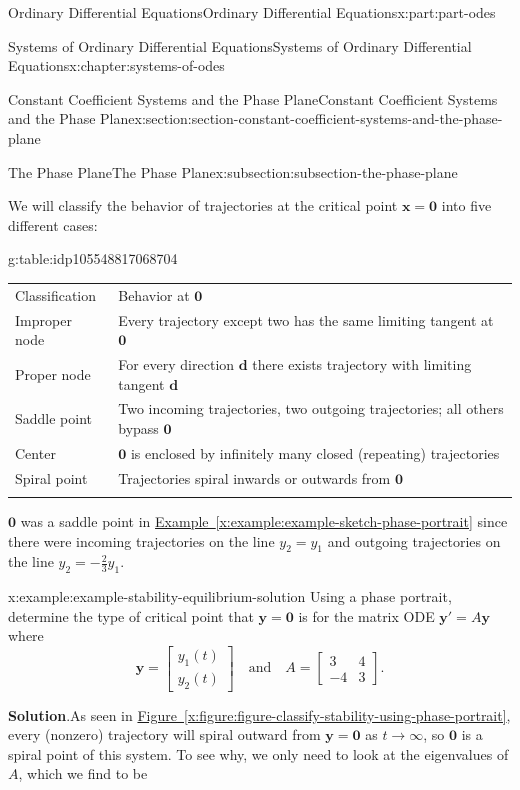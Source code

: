 \documentclass[twoside,10pt,]{book}
\newcommand{\blocktitlefont}{\relax}
\newcommand{\tabularfont}{\relax}
\newcommand{\xreffont}{\relax}
\numberwithin{equation}{part}
\newcommand{\hrulethick} {\noalign{\hrule height 0.11em}}
\renewcommand{\vec}[1]{\mathbf{#1}}
\newcommand{\amp}{&}
\begin{document}
\begin{partptx}{Ordinary Differential Equations}{}{Ordinary Differential Equations}{}{}{x:part:part-odes}
\begin{chapterptx}{Systems of Ordinary Differential Equations}{}{Systems of Ordinary Differential Equations}{}{}{x:chapter:systems-of-odes}
\begin{sectionptx}{Constant Coefficient Systems and the Phase Plane}{}{Constant Coefficient Systems and the Phase Plane}{}{}{x:section:section-constant-coefficient-systems-and-the-phase-plane}
\begin{subsectionptx}{The Phase Plane}{}{The Phase Plane}{}{}{x:subsection:subsection-the-phase-plane}
\par
We will classify the behavior of trajectories at the critical point \(\vec{x} = \vec{0}\) into five different cases:%
\begin{tableptx}{\textbf{}}{g:table:idp105548817068704}{}%
\centering%
{\tabularfont%
\begin{tabular}{ll}\hrulethick
Classification&Behavior at \(\vec{0}\)\tabularnewline\hrulethick
Improper node&Every trajectory except two has the same limiting tangent at \(\vec{0}\)\tabularnewline[0pt]
Proper node&For every direction \(\vec{d}\) there exists trajectory with limiting tangent \(\vec{d}\)\tabularnewline[0pt]
Saddle point&Two incoming trajectories, two outgoing trajectories; all others bypass \(\vec{0}\)\tabularnewline[0pt]
Center&\(\vec{0}\) is enclosed by infinitely many closed (repeating) trajectories\tabularnewline[0pt]
Spiral point&Trajectories spiral inwards or outwards from \(\vec{0}\)\tabularnewline\hrulethick
\end{tabular}
}%
\end{tableptx}%
\(\vec{0}\) was a saddle point in \hyperref[x:example:example-sketch-phase-portrait]{Example~{\xreffont\ref{x:example:example-sketch-phase-portrait}}} since there were incoming trajectories on the line \(y_{2} = y_{1}\) and outgoing trajectories on the line \(y_{2} = -\frac{2}{3}y_{1}\).%
\begin{example}{}{x:example:example-stability-equilibrium-solution}%
Using a phase portrait, determine the type of critical point that \(\vec{y} = \vec{0}\) is for the matrix ODE \(\vec{y}'=A\vec{y}\) where%
\begin{equation*}
\vec{y} = \begin{bmatrix}y_{1}(t) \\ y_{2}(t)\end{bmatrix}\quad\text{and}\quad A = \begin{bmatrix}3 \amp  4 \\ -4 \amp  3\end{bmatrix}.
\end{equation*}
%
\par\smallskip%
\noindent\textbf{\blocktitlefont Solution}.\hypertarget{g:solution:idp105548817242656}{}\quad{}As seen in \hyperref[x:figure:figure-classify-stability-using-phase-portrait]{Figure~{\xreffont\ref{x:figure:figure-classify-stability-using-phase-portrait}}}, every (nonzero) trajectory will spiral outward from \(\vec{y} = \vec{0}\) as \(t\to\infty\), so \(\vec{0}\) is a spiral point of this system. To see why, we only need to look at the eigenvalues of \(A\), which we find to be%

\end{example}
\end{subsectionptx}
\end{sectionptx}
\end{chapterptx}
\end{partptx}
\end{document}
